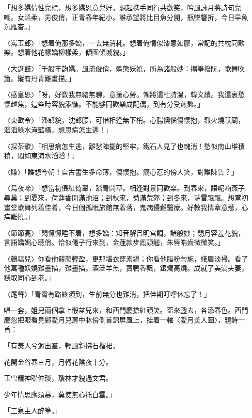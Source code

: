 \begin{myquote}
「想多嬌情性兒標，想多嬌恩意兒好。想起携手同行共歡笑，吟風詠月將詩句兒嘲。女溫柔，男俊俏，正青春年紀小。誰承望將比目魚分開，瓶墜簪折，今日早魚沉雁杳。」

{\markfont〈罵玉郎〉}「想着俺那多嬌，一去無消耗。想着俺情似漆意如膠，常記的共枕同歡樂。想着他花樣嬌柳樣柔，傾國傾城貌。」

{\markfont〈大迓鼓〉}「千般丰韵嬌。風流俊俏，體態妖嬈，所為諸般妙：搊箏撥阮，歌舞吹簫。縱有丹青難畫描。」

{\markfont〈感皇恩〉}「呀，好敎我無緒無聊，意攘心勞。懶將這杜詩溫，韓文續。我這裏愁懷越焦，這些時容貌添憔。不能够同歡樂成配偶，到有分受煎熬。」

{\markfont〈東歐令〉}「潘郎貌，沈郎腰，可惜相逢無下梢。心腸懊惱傷懷抱，烈火燒祅廟，滔滔綠水淹藍橋，想思病怎生逃！」

{\markfont〈採茶歌〉}「相思病怎生逃，離愁陣擺的堅牢，鐵石人見了也魂消！愁似南山堆積積，悶如東海水滔滔！」

{\markfont〈賺〉}「誰想今朝！自古書生多命薄，傷懷抱。癡心惹的傍人笑，對誰陳告？」

{\markfont〈烏夜啼〉}「想當初偎紅倚翠，踏青鬦草。相逢對景同歡楽。到春來，語呢喃燕子尋巢；到夏來，荷蓮香開滿池沼；到秋來，菊滿荒郊；到冬來，瑞雪飄飄。想當初畫堂歌舞列着佳肴，今日個孤眠旅館無着落，鬼病侵難醫療。好教我情牽意惹，心痒難撓。」

{\markfont〈節節高〉}「悶懨懨睡不着，想多嬌：知音解吕明宫調，諸般妙；閉月容羞花貌，言語嬌媚心聰俏。恰似僊子行來到，金蓮款步鳳頭翹，朱唇皓齒微微笑。」

{\markfont〈鵪鶉兒〉}你看他體態輕盈，更那堪衣穿素縞；你看他脂粉勻施，蛾眉淡掃。看了他萬種妖嬈難畫描，難畫描。酒泛羊羔，寳鴨香飄，銀燭高燒。成就了美滿夫妻，穩取同心到老。」

{\markfont〈尾聲〉}「青霄有路終須到，生前無分也難消，把佳期叮嚀休忘了！」
\end{myquote}

唱一套，姐兒兩個拿上骰盆兒來，和西門慶搶紅頑笑。盃來盞去，各添春色。西門慶忽把眼看見鄭愛月兒房中牀傍側首錦屏風上，挂着一軸〈愛月羙人圖〉，題詩一首：

\begin{myquote}
「有羙人兮迥出羣，輕風斜拂石榴裙。

花開金谷春三月，月轉花陰夜十分。

玉雪精神聯仲琰，瓊林才貌過文君。

少年情思應須慕，莫使無心托白雲。」

\begin{flushright}
{}「三泉主人醉筆。」
\end{flushright}
\end{myquote}

